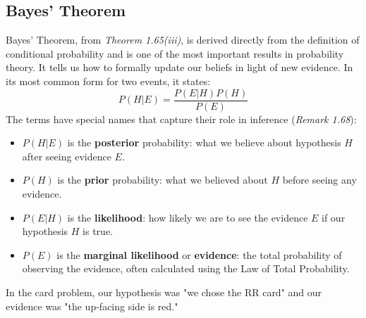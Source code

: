 \documentclass[11pt,a4paper]{article}
\theoremstyle{tutorstyle}
\begin{document}
\subsection{\hypertarget{concept_bayes}{Bayes' Theorem}}
Bayes' Theorem, from \textit{Theorem 1.65(iii)}, is derived directly from the definition of conditional probability and is one of the most important results in probability theory. It tells us how to formally update our beliefs in light of new evidence. In its most common form for two events, it states:
\[
P(H | E) = \frac{P(E | H) P(H)}{P(E)}
\]
The terms have special names that capture their role in inference (\textit{Remark 1.68}):
\begin{itemize}
    \item $P(H | E)$ is the \textbf{posterior} probability: what we believe about hypothesis $H$ after seeing evidence $E$.
    \item $P(H)$ is the \textbf{prior} probability: what we believed about $H$ before seeing any evidence.
    \item $P(E | H)$ is the \textbf{likelihood}: how likely we are to see the evidence $E$ if our hypothesis $H$ is true.
    \item $P(E)$ is the \textbf{marginal likelihood} or \textbf{evidence}: the total probability of observing the evidence, often calculated using the Law of Total Probability.
\end{itemize}
In the card problem, our hypothesis was "we chose the RR card" and our evidence was "the up-facing side is red."
\end{document}
